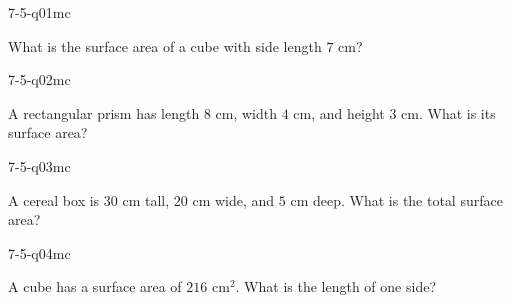 

\begin{practiceQuestion}{7-5-q01}{mc}
\begin{questionText}
What is the surface area of a cube with side length $7$ cm?
\end{questionText}
\end{practiceQuestion}

\begin{practiceQuestion}{7-5-q02}{mc}
\begin{questionText}
A rectangular prism has length $8$ cm, width $4$ cm, and height $3$ cm. What is its surface area?
\end{questionText}
\end{practiceQuestion}

\begin{practiceQuestion}{7-5-q03}{mc}
\begin{questionText}
A cereal box is $30$ cm tall, $20$ cm wide, and $5$ cm deep. What is the total surface area?
\end{questionText}
\end{practiceQuestion}

\begin{practiceQuestion}{7-5-q04}{mc}
\begin{questionText}
A cube has a surface area of $216$ cm$^2$. What is the length of one side?
\end{questionText}
\end{practiceQuestion}

